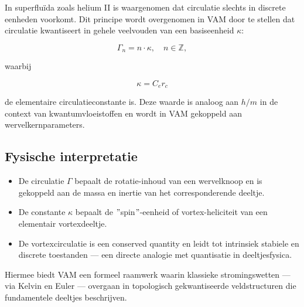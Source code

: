 In superfluïda zoals helium II is waargenomen dat circulatie slechts in discrete eenheden voorkomt. Dit principe wordt overgenomen in VAM door te stellen dat circulatie kwantiseert in gehele veelvouden van een basiseenheid \( \kappa \):

\begin{equation}
\Gamma_n = n \cdot \kappa, \quad n \in \mathbb{Z},
\end{equation}

waarbij

\begin{equation}
\kappa = C_e r_c
\end{equation}

de elementaire circulatieconstante is. Deze waarde is analoog aan \( h/m \) in de context van kwantumvloeistoffen en wordt in VAM gekoppeld aan wervelkernparameters.

\subsection{Fysische interpretatie}

\begin{itemize}
    \item De circulatie \( \Gamma \) bepaalt de rotatie-inhoud van een wervelknoop en is gekoppeld aan de massa en inertie van het corresponderende deeltje.
    \item De constante \( \kappa \) bepaalt de \("\)spin\("\)-eenheid of vortex-heliciteit van een elementair vortexdeeltje.
    \item De vortexcirculatie is een conserved quantity en leidt tot intrinsiek stabiele en discrete toestanden — een directe analogie met quantisatie in deeltjesfysica.
\end{itemize}

Hiermee biedt VAM een formeel raamwerk waarin klassieke stromingswetten — via Kelvin en Euler — overgaan in topologisch gekwantiseerde veldstructuren die fundamentele deeltjes beschrijven.
